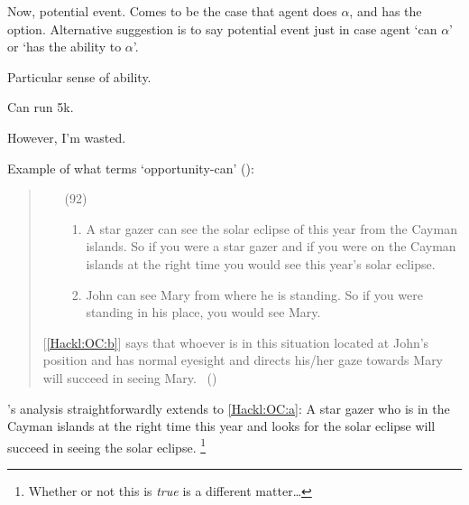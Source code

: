 \begin{note}
  Now, potential event.
  Comes to be the case that agent does \(\alpha\), and has the option.
  Alternative suggestion is to say potential event just in case agent `can \(\alpha\)' or `has the ability to \(\alpha\)'.

  Particular sense of ability.

  Can run 5k.

  However, I'm wasted.
\end{note}

\begin{note}
  Example of what \textcite{Hackl:1998tt} terms `opportunity-can' (\citeyear[14]{Hackl:1998tt}):

  \begin{quote}
    \begin{enumerate}
    \item[(92)]
      \begin{enumerate}[label=\alph*., ref=(\alph*)]
      \item
        \label{Hackl:OC:a}
        A star gazer can see the solar eclipse of this year from the Cayman islands.\newline
        So if you were a star gazer and if you were on the Cayman islands at the right time you would see this year's solar eclipse.
      \item
        \label{Hackl:OC:b}
        John can see Mary from where he is standing.\newline
        So if you were standing in his place, you would see Mary.
      \end{enumerate}
    \end{enumerate}

    [\ref{Hackl:OC:b}] says that whoever is in this situation located at John's position and has normal eyesight and directs his/her gaze towards Mary will succeed in seeing Mary.%
    \mbox{ }\hfill\mbox{(\citeyear[39]{Hackl:1998tt})}
  \end{quote}
  \citeauthor{Hackl:1998tt}'s analysis straightforwardly extends to \ref{Hackl:OC:a}:
  A star gazer who is in the Cayman islands at the right time this year and looks for the solar eclipse will succeed in seeing the solar eclipse.%
  \footnote{
    Whether or not this is \emph{true} is a different matter\dots
  }
\end{note}

